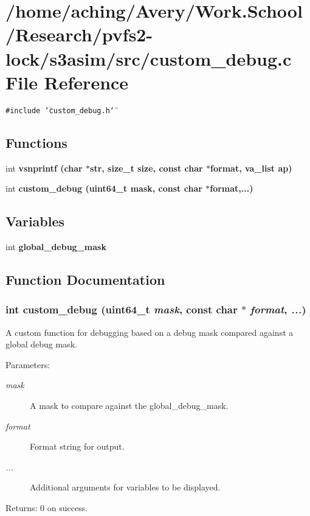 \section{/home/aching/Avery/Work.School/Research/pvfs2-lock/s3asim/src/custom\_\-debug.c File Reference}
\label{custom__debug_8c}
{\tt \#include \char`\"{}custom\_\-debug.h\char`\"{}}\par
\subsection*{Functions}
\begin{CompactItemize}
\item 
int \bf{vsnprintf} (char $\ast$str, size\_\-t size, const char $\ast$format, va\_\-list ap)
\item 
int \bf{custom\_\-debug} (uint64\_\-t mask, const char $\ast$format,...)
\end{CompactItemize}
\subsection*{Variables}
\begin{CompactItemize}
\item 
int \bf{global\_\-debug\_\-mask}
\end{CompactItemize}


\subsection{Function Documentation}
\subsubsection{\setlength{\rightskip}{0pt plus 5cm}int custom\_\-debug (uint64\_\-t {\em mask}, const char $\ast$ {\em format},  {\em ...})}\label{custom__debug_8c_a4090d810165be7e73bbed83b6ddde2e}


A custom function for debugging based on a debug mask compared against a global debug mask.

\begin{Desc}
\item[Parameters:]
\begin{description}
\item[{\em mask}]A mask to compare against the global\_\-debug\_\-mask. \item[{\em format}]Format string for output. \item[{\em ...}]Additional arguments for variables to be displayed. \end{description}
\end{Desc}
\begin{Desc}
\item[Returns:]0 on success. \end{Desc}
